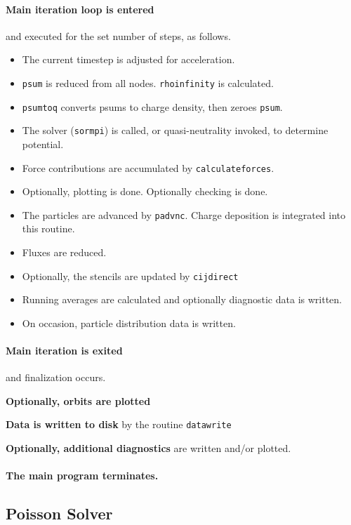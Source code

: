 \documentclass[12pt]{article}
\def\sentence#1{\par\noindent\textbf{#1}}
\begin{document}
\paragraph{Main iteration loop is entered} and executed for the set
number of steps, as follows.
\begin{itemize}\itemsep=0pt
\item The current timestep is adjusted for acceleration.
\item \verb!psum! is reduced from all nodes. \verb!rhoinfinity! is calculated.
\item \verb!psumtoq! converts psums to charge density, then zeroes \verb!psum!.
\item The solver  (\verb!sormpi!) is called, or
  quasi-neutrality invoked, to determine potential.
\item Force contributions are accumulated by \verb!calculateforces!.
\item Optionally, plotting is done. Optionally checking is done.
\item The particles are advanced by \verb!padvnc!. Charge deposition
is integrated into this routine.
\item Fluxes are reduced.
\item Optionally, the stencils are updated by \verb!cijdirect!
\item Running averages are calculated and optionally diagnostic data
  is written. 
\item On occasion, particle distribution data is written. 
\end{itemize}


\paragraph{Main iteration is exited} and finalization occurs.

\sentence{Optionally, orbits are plotted}

\sentence{Data is written to disk} by the routine \verb!datawrite!

\sentence{Optionally, additional diagnostics} are written and/or
plotted.

\paragraph{The main program terminates.}

\subsection{Poisson Solver}
\end{document}
